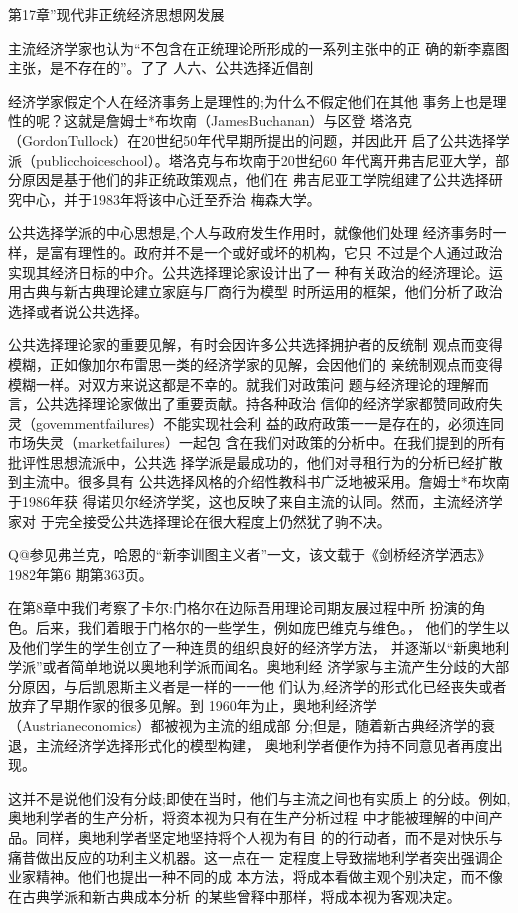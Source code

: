 第17章”现代非正统经济思想网发展

主流经济学家也认为“不包含在正统理论所形成的一系列主张中的正
确的新李嘉图主张，是不存在的”。了了
人六、公共选择近倡剖

经济学家假定个人在经济事务上是理性的;为什么不假定他们在其他
事务上也是理性的呢？这就是詹姆士*布坎南（JamesBuchanan）与区登
塔洛克（GordonTullock）在20世纪50年代早期所提出的问题，并因此开
启了公共选择学派（publicchoiceschool）。塔洛克与布坎南于20世纪60
年代离开弗吉尼亚大学，部分原因是基于他们的非正统政策观点，他们在
弗吉尼亚工学院组建了公共选择研究中心，并于1983年将该中心迁至乔治
梅森大学。

公共选择学派的中心思想是,个人与政府发生作用时，就像他们处理
经济事务时一样，是富有理性的。政府并不是一个或好或坏的机构，它只
不过是个人通过政治实现其经济日标的中介。公共选择理论家设计出了一
种有关政治的经济理论。运用古典与新古典理论建立家庭与厂商行为模型
时所运用的框架，他们分析了政治选择或者说公共选择。

公共选择理论家的重要见解，有时会因许多公共选择拥护者的反统制
观点而变得模糊，正如像加尔布雷思一类的经济学家的见解，会因他们的
亲统制观点而变得模糊一样。对双方来说这都是不幸的。就我们对政策问
题与经济理论的理解而言，公共选择理论家做出了重要贡献。持各种政治
信仰的经济学家都赞同政府失灵（govemmentfailures）不能实现社会利
益的政府政策一一是存在的，必须连同市场失灵（marketfailures）一起包
含在我们对政策的分析中。在我们提到的所有批评性思想流派中，公共选
择学派是最成功的，他们对寻租行为的分析已经扩散到主流中。很多具有
公共选择风格的介绍性教科书广泛地被采用。詹姆士*布坎南于1986年获
得诺贝尔经济学奖，这也反映了来自主流的认同。然而，主流经济学家对
于完全接受公共选择理论在很大程度上仍然犹了驹不决。


Q@参见弗兰克，哈恩的“新李训图主义者”一文，该文载于《剑桥经济学洒志》1982年第6
期第363页。

在第8章中我们考察了卡尔:门格尔在边际吾用理论司期友展过程中所
扮演的角色。后来，我们着眼于门格尔的一些学生，例如庞巴维克与维色。，
他们的学生以及他们学生的学生创立了一种连贯的组织良好的经济学方法，
并逐渐以“新奥地利学派”或者简单地说以奥地利学派而闻名。奥地利经
济学家与主流产生分歧的大部分原因，与后凯恩斯主义者是一样的一一他
们认为,经济学的形式化已经丧失或者放弃了早期作家的很多见解。到
1960年为止，奥地利经济学（Austrianeconomics）都被视为主流的组成部
分;但是，随着新古典经济学的衰退，主流经济学选择形式化的模型构建，
奥地利学者便作为持不同意见者再度出现。

这并不是说他们没有分歧;即使在当时，他们与主流之间也有实质上
的分歧。例如,奥地利学者的生产分析，将资本视为只有在生产分析过程
中才能被理解的中间产品。同样，奥地利学者坚定地坚持将个人视为有目
的的行动者，而不是对快乐与痛昔做出反应的功利主义机器。这一点在一
定程度上导致揣地利学者突出强调企业家精神。他们也提出一种不同的成
本方法，将成本看做主观个别决定，而不像在古典学派和新古典成本分析
的某些曾释中那样，将成本视为客观决定。

